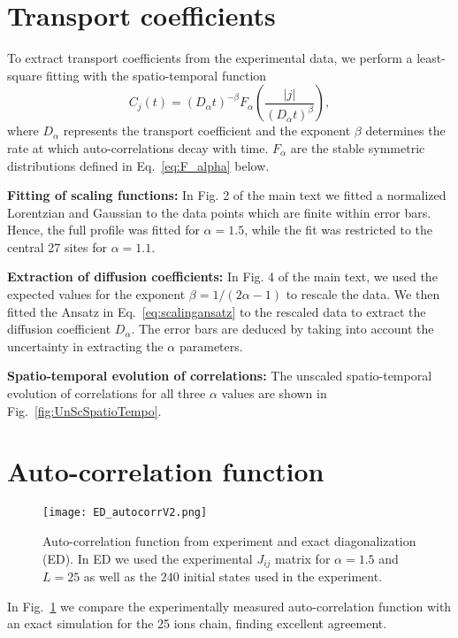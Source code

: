 \documentclass[aps,10pt,reprint,groupedaddress,superscriptaddress]{revtex4-2}
\begin{document}
\section{Transport coefficients} To extract transport coefficients from the experimental data, we perform a least-square fitting with the spatio-temporal function
\begin{equation}
    C_j(t)=(D_\alpha t)^{-\beta} F_{\alpha}\left(\frac{|j|}{(D_{\alpha}t)^\beta}\right),
    \label{eq:scalingansatz}
\end{equation}
where $D_\alpha$ represents the transport coefficient and the exponent $\beta$ determines the rate at which auto-correlations decay with time.  $F_\alpha$ are the stable symmetric distributions defined in Eq.~\ref{eq:F_alpha} below.


\textbf{Fitting of scaling functions:} In Fig. 2 of the main text we fitted a normalized Lorentzian
and Gaussian
to the data points which are finite within error bars. Hence, the full profile was fitted for $\alpha=1.5$, while the fit was restricted to the central 27 sites for $\alpha=1.1$.

\textbf{Extraction of diffusion coefficients: } In Fig. 4 of the main text, we used the expected values for the exponent $\beta=1/(2\alpha-1)$ to rescale the data. We then fitted the Ansatz in Eq.~\ref{eq:scalingansatz} to the rescaled data to extract the diffusion coefficient $D_\alpha$. The error bars are deduced by taking into account the uncertainty in extracting the $\alpha$ parameters.  

\textbf{Spatio-temporal evolution of correlations: }
The unscaled spatio-temporal evolution of correlations for all three $\alpha$ values are shown in Fig.~\ref{fig:UnScSpatioTempo}. 

\section{Auto-correlation function}
\begin{figure}
    \centering
    \texttt{[image: ED\_autocorrV2.png]}
    \caption{Auto-correlation function from experiment and exact diagonalization (ED). In ED we used the experimental $J_{ij}$ matrix for $\alpha=1.5$ and $L=25$ as well as the $240$ initial states used in the experiment.}
    \label{fig:ED_vs_Exp}
\end{figure}
In Fig.~\ref{fig:ED_vs_Exp} we compare the experimentally measured auto-correlation function with an exact simulation for the 25 ions chain, finding excellent agreement.
\end{document}
